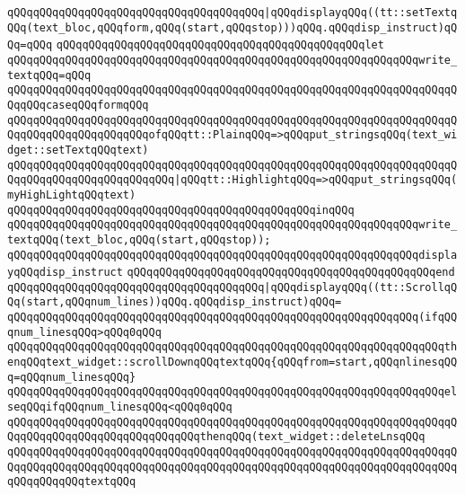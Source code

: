 \verb|qQQqqQQqqQQqqQQqqQQqqQQqqQQqqQQqqQQqqQQq|\verb#|qQQqdisplayqQQq((tt::setTextqQQq(text_bloc,qQQqform,qQQq(start,qQQqstop)))qQQq.qQQqdisp_instruct)qQQq=qQQq#\newline
\verb|qQQqqQQqqQQqqQQqqQQqqQQqqQQqqQQqqQQqqQQqqQQqqQQqlet|\newline
\verb|qQQqqQQqqQQqqQQqqQQqqQQqqQQqqQQqqQQqqQQqqQQqqQQqqQQqqQQqqQQqqQQqwrite_textqQQq=qQQq|\newline
\verb|qQQqqQQqqQQqqQQqqQQqqQQqqQQqqQQqqQQqqQQqqQQqqQQqqQQqqQQqqQQqqQQqqQQqqQQqqQQqcaseqQQqformqQQq|\newline
\verb|qQQqqQQqqQQqqQQqqQQqqQQqqQQqqQQqqQQqqQQqqQQqqQQqqQQqqQQqqQQqqQQqqQQqqQQqqQQqqQQqqQQqqQQqqQQqofqQQqtt::PlainqQQq=>qQQqput_stringsqQQq(text_widget::setTextqQQqtext)|\newline
\verb|qQQqqQQqqQQqqQQqqQQqqQQqqQQqqQQqqQQqqQQqqQQqqQQqqQQqqQQqqQQqqQQqqQQqqQQqqQQqqQQqqQQqqQQqqQQqqQQq|\verb#|qQQqtt::HighlightqQQq=>qQQqput_stringsqQQq(myHighLightqQQqtext)#\newline
\verb|qQQqqQQqqQQqqQQqqQQqqQQqqQQqqQQqqQQqqQQqqQQqqQQqinqQQq|\newline
\verb|qQQqqQQqqQQqqQQqqQQqqQQqqQQqqQQqqQQqqQQqqQQqqQQqqQQqqQQqqQQqqQQqwrite_textqQQq(text_bloc,qQQq(start,qQQqstop));|\newline
\verb|qQQqqQQqqQQqqQQqqQQqqQQqqQQqqQQqqQQqqQQqqQQqqQQqqQQqqQQqqQQqqQQqdisplayqQQqdisp_instruct|\newline
\verb|qQQqqQQqqQQqqQQqqQQqqQQqqQQqqQQqqQQqqQQqqQQqqQQqend|\newline
\newline
\verb|qQQqqQQqqQQqqQQqqQQqqQQqqQQqqQQqqQQqqQQq|\verb#|qQQqdisplayqQQq((tt::ScrollqQQq(start,qQQqnum_lines))qQQq.qQQqdisp_instruct)qQQq=#\newline
\verb|qQQqqQQqqQQqqQQqqQQqqQQqqQQqqQQqqQQqqQQqqQQqqQQqqQQqqQQqqQQqqQQq(ifqQQqnum_linesqQQq>qQQq0qQQq|\newline
\verb|qQQqqQQqqQQqqQQqqQQqqQQqqQQqqQQqqQQqqQQqqQQqqQQqqQQqqQQqqQQqqQQqqQQqthenqQQqtext_widget::scrollDownqQQqtextqQQq{qQQqfrom=start,qQQqnlinesqQQq=qQQqnum_linesqQQq}|\newline
\verb|qQQqqQQqqQQqqQQqqQQqqQQqqQQqqQQqqQQqqQQqqQQqqQQqqQQqqQQqqQQqqQQqqQQqelseqQQqifqQQqnum_linesqQQq<qQQq0qQQq|\newline
\verb|qQQqqQQqqQQqqQQqqQQqqQQqqQQqqQQqqQQqqQQqqQQqqQQqqQQqqQQqqQQqqQQqqQQqqQQqqQQqqQQqqQQqqQQqqQQqqQQqqQQqthenqQQq(text_widget::deleteLnsqQQq|\newline
\verb|qQQqqQQqqQQqqQQqqQQqqQQqqQQqqQQqqQQqqQQqqQQqqQQqqQQqqQQqqQQqqQQqqQQqqQQqqQQqqQQqqQQqqQQqqQQqqQQqqQQqqQQqqQQqqQQqqQQqqQQqqQQqqQQqqQQqqQQqqQQqqQQqqQQqqQQqtextqQQq|\newline
